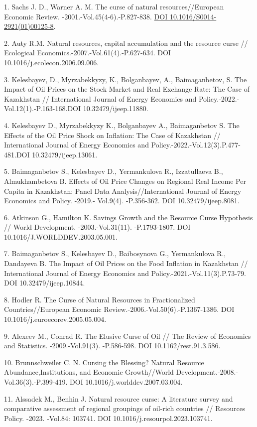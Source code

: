 \begin{refs}
1. Sachs J. D., Warner A. M. The curse of natural resources//European
Economic Review. -2001.-Vol.45(4-6).-P.827-838.
\href{https://doi.org/10.1016/S0014-2921(01)00125-8}{DOI
10.1016/S0014-2921(01)00125-8}.

2. Auty R.M. Natural resources, capital accumulation and the resource
curse // Ecological Economics.-2007.-Vol.61(4).-P.627-634. DOI
10.1016/j.ecolecon.2006.09.006.

3. Kelesbayev, D., Myrzabekkyzy, K., Bolganbayev, A., Baimaganbetov, S.
The Impact of Oil Prices on the Stock Market and Real Exchange Rate: The
Case of Kazakhstan // International Journal of Energy Economics and
Policy.-2022.-Vol.12(1).-P.163-168.DOI 10.32479/ijeep.11880.

4. Kelesbayev D., Myrzabekkyzy K., Bolganbayev A., Baimaganbetov S. The
Effects of the Oil Price Shock on Inflation: The Case of Kazakhstan //
International Journal of Energy Economics and
Policy.-2022.-Vol.12(3).P.477-481.DOI 10.32479/ijeep.13061.

5. Baimaganbetov S., Kelesbayev D., Yermankulova R., Izzatullaeva B.,
Almukhambetova B. Effects of Oil Price Changes on Regional Real Income
Per Capita in Kazakhstan: Panel Data Analysis//International Journal of
Energy Economics and Policy. -2019.- Vol.9(4). -P.356-362. DOI
10.32479/ijeep.8081.

6. Atkinson G., Hamilton K. Savings Growth and the Resource Curse
Hypothesis // World Development. -2003.-Vol.31(11). -P.1793-1807. DOI
10.1016/J.WORLDDEV.2003.05.001.

7. Baimaganbetov S., Kelesbayev D., Baibosynova G., Yermankulova R.,
Dandayeva B. The Impact of Oil Prices on the Food Inflation in
Kazakhstan // International Journal of Energy Economics and
Policy.-2021.-Vol.11(3).P.73-79. DOI 10.32479/ijeep.10844.

8. Hodler R. The Curse of Natural Resources in Fractionalized
Countries//European Economic Review.-2006.-Vol.50(6).-P.1367-1386. DOI
10.1016/j.euroecorev.2005.05.004.

9. Alexeev M., Conrad R. The Elusive Curse of Oil // The Review of
Economics and Statistics. -2009.-Vol.91(3). -P.586-598. DOI
10.1162/rest.91.3.586.

10. Brunnschweiler C. N. Cursing the Blessing? Natural Resource
Abundance,Institutions, and Economic Growth//World
Development.-2008.-Vol.36(3).-P.399-419. DOI 10.1016/j.worlddev.2007.03.004.

11. Alssadek M., Benhin J. Natural resource curse: A literature survey
and comparative assessment of regional groupings of oil-rich countries
// Resources Policy. -2023. -Vol.84: 103741. DOI
10.1016/j.resourpol.2023.103741.


\end{refs}
